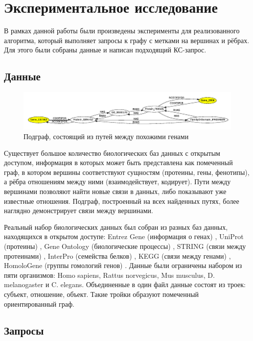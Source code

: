 \documentclass[14pt]{matmex-diploma}
\begin{document}
\section{Экспериментальное исследование}

В рамках данной работы были произведены эксперименты для реализованного алгоритма,  который выполняет запросы к графу с метками на вершинах и рёбрах. Для этого были собраны данные и написан подходящий КС-запрос.

\subsection{Данные}

\begin{figure}
\centering
\includegraphics[width=16cm]{images/subgraphY1.pdf}
\caption{Подграф, состоящий из путей между похожими генами}
\label{subgraph}
\end{figure}

Существует большое количество биологических баз данных с открытым доступом, информация в которых может быть представлена как помеченный граф, в котором вершины соответствуют сущностям (протеины, гены, фенотипы), а рёбра отношениям между ними (взаимодействует, кодирует). Пути между вершинами позволяют найти новые связи в данных, либо показывают уже известные отношения. Подграф, построенный на всех найденных путях, более наглядно демонстрирует связи между вершинами.

Реальный набор биологических данных был собран из разных баз данных, находящихся в открытом доступе:  Entrez Gene (информация о генах) \cite{entrezgene}, UniProt (протеины) \cite{uniprot}, Gene Ontology (биологические процессы) \cite{geneontology}, STRING (связи между протеинами) \cite{string}, InterPro (семейства белков) \cite{interpro}, KEGG (связи между генами) \cite{kegg}, HomoloGene (группы гомологий генов) \cite{homologene}. Данные были ограничены набором из пяти организмов: Homo sapiens, Rattus norvegicus, Mus musculus, D. melanogaster и C. elegans. Объединенные в один файл данные состоят из троек: субъект, отношение, объект. Такие тройки образуют помеченный ориентированный граф.
\subsection{Запросы}
\end{document}

